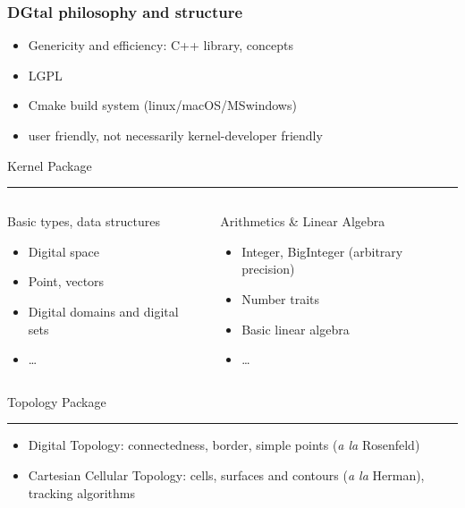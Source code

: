 \documentclass[8pt]{beamer}
\newcommand{\HH}{ \vspace{0.5pt}\hrule}
\begin{document}
\begin{frame}%
  \frametitle{DGtal philosophy and structure}

  \begin{block}{}
    \small
    \begin{itemize}
    \item  Genericity and efficiency: C++ library, concepts
    \item  LGPL
    \item Cmake build system (linux/macOS/MSwindows)
    \item user friendly, not necessarily kernel-developer friendly
    \end{itemize}
  \end{block} 
  \begin{alertblock}{\centering Kernel Package\HH}
    \begin{columns}
      \begin{column}{0.44\textwidth}
        \begin{alertblock}{Basic types, data structures}
          \small
          \begin{itemize}
          \item Digital space
          \item  Point, vectors
            \item Digital domains and digital sets
             \item  \ldots  
          \end{itemize}
        \end{alertblock}
      \end{column}
      \begin{column}{0.44\textwidth}
        \begin{alertblock}{Arithmetics \& Linear Algebra}
          \footnotesize
          \begin{itemize}
          \item Integer, BigInteger (arbitrary precision)
          \item Number traits
          \item Basic linear algebra
          \item \ldots
          \end{itemize}
        \end{alertblock}
      \end{column}
    \end{columns}
  \end{alertblock}
  \begin{alertblock}{\centering Topology Package\HH}
    \small
       \begin{itemize}
    \item Digital Topology: connectedness, border, simple points
      (\emph{a la} Rosenfeld)
    \item Cartesian Cellular Topology: cells,  surfaces and contours
      (\emph{a la} Herman), tracking algorithms
    \end{itemize}
  \end{alertblock}
\end{frame}
\end{document}
